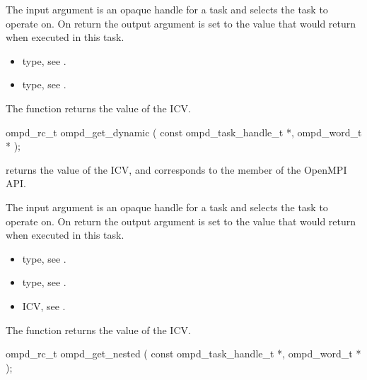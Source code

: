 \argdesc
The input argument  is an opaque handle for a task and selects the task to operate on.
On return the output argument  is set to the value that  would return when
executed in this task.

\crossreferences
\begin{itemize}
	\item {} type, see .
	\item {} type, see .
\end{itemize}


\label{ompd:ompd_get_dynamic}
\summary
The  function returns the value of the  ICV.

\format
\cspecificstart
\begin{ompSyntax}
ompd_rc_t ompd_get_dynamic (
  const ompd_task_handle_t *,
  ompd_word_t *
);
\end{ompSyntax}
\cspecificend

\descr
{} returns the value of the
 ICV,
and corresponds to the  member of the OpenMPI API.

\argdesc
The input argument  is an opaque handle for a task and selects the task to operate on.
On return the output argument  is set to the value that  would return when
executed in this task.

\crossreferences
\begin{itemize}
	\item {} type, see .
	\item {} type, see .
	\item {} ICV, see .
\end{itemize}


\label{ompd:ompd_get_nested}
\summary
The  function returns the value of the  ICV.

\format
\cspecificstart
\begin{ompSyntax}
ompd_rc_t ompd_get_nested (
  const ompd_task_handle_t *,
  ompd_word_t *
);
\end{ompSyntax}
\cspecificend

